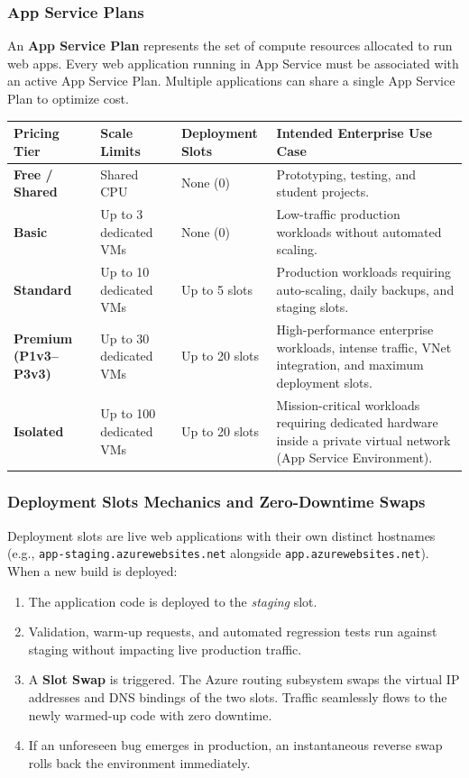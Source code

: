 \documentclass[11pt,a4paper,openany]{report}
\begin{document}
\subsubsection{App Service Plans}
An \textbf{App Service Plan} represents the set of compute resources allocated to run web apps. Every web application running in App Service must be associated with an active App Service Plan. Multiple applications can share a single App Service Plan to optimize cost.
\begin{center}
\begin{tabularx}{\textwidth}{>{\bfseries}l p{2.2cm} p{2.5cm} X}
\toprule
Pricing Tier & Scale Limits & Deployment Slots & Intended Enterprise Use Case\\
\midrule
Free / Shared & Shared CPU & None (0) & Prototyping, testing, and student projects.\\
Basic & Up to 3 dedicated VMs & None (0) & Low-traffic production workloads without automated scaling.\\
Standard & Up to 10 dedicated VMs & Up to 5 slots & Production workloads requiring auto-scaling, daily backups, and staging slots.\\
Premium (P1v3--P3v3) & Up to 30 dedicated VMs & Up to 20 slots & High-performance enterprise workloads, intense traffic, VNet integration, and maximum deployment slots.\\
Isolated & Up to 100 dedicated VMs & Up to 20 slots & Mission-critical workloads requiring dedicated hardware inside a private virtual network (App Service Environment).\\
\bottomrule
\end{tabularx}
\end{center}

\subsubsection{Deployment Slots Mechanics and Zero-Downtime Swaps}
Deployment slots are live web applications with their own distinct hostnames (e.g., \texttt{app-staging.azurewebsites.net} alongside \texttt{app.azurewebsites.net}). When a new build is deployed:
\begin{enumerate}[leftmargin=*]
  \item The application code is deployed to the \emph{staging} slot.
  \item Validation, warm-up requests, and automated regression tests run against staging without impacting live production traffic.
  \item A \textbf{Slot Swap} is triggered. The Azure routing subsystem swaps the virtual IP addresses and DNS bindings of the two slots. Traffic seamlessly flows to the newly warmed-up code with zero downtime.
  \item If an unforeseen bug emerges in production, an instantaneous reverse swap rolls back the environment immediately.
\end{enumerate}
\end{document}
